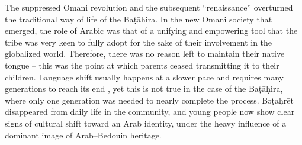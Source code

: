 \documentclass[output=paper]{langscibook}
\begin{document}
\hspace*{-3.5pt}The suppressed Omani revolution and the subsequent ``renaissance'' overturned the traditional way of life of the Baṭāhira. In the new Omani society that emerged, the role of Arabic was that of a unifying and empowering tool that the tribe was very keen to fully adopt for the sake of their involvement in the globalized world. Therefore, there was no reason left to maintain their native tongue – this was the point at which parents ceased transmitting it to their children. Language shift usually happens at a slower pace and requires many generations to reach its end \citep{dorian_pidgins_1989}, yet this is not true in the case of the Baṭāḥira, where only one generation was needed to nearly complete the process. Bəṭaḥrēt disappeared from daily life in the community, and young people now show clear signs of cultural shift toward an Arab identity, under the heavy influence of a dominant image of Arab–Bedouin heritage.
\end{document}
